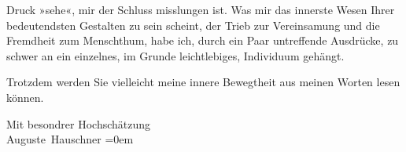                Druck »sehe«,  mir der Schluss misslungen ist.
               Was mir das innerste Wesen Ihrer bedeutendsten Gestalten zu sein scheint, {\pb}der Trieb zur Vereinsamung und die Fremdheit zum Menschthum,
               habe ich, durch ein Paar untreffende Ausdrücke, zu schwer an ein einzelnes, im Grunde
               leichtlebiges, Individuum gehängt.\pend
           
\pstart
           Trotzdem werden Sie vielleicht meine innere Bewegtheit aus meinen Worten lesen
               können.\pend
           
\pstart
           Mit besondrer Hochschätzung{\\[\baselineskip]}\spacefill\mbox{Auguste Hauschner}\pend
           \leftskip=0em{}\endnumbering{}  \newcommand{\dateiname}{L02587}\newcommand{\titel}{Auguste Hauschner an Arthur Schnitzler, 16. 1. 1909}\newcommand{\editorInnen}{Martin Anton Müller und Laura Untner}
